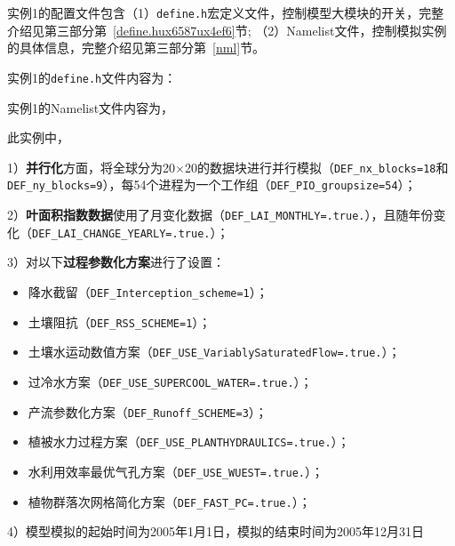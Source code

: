 实例1的配置文件包含（1）\texttt{define.h}宏定义文件，控制模型大模块的开关，完整介绍见第三部分第~\ref{define.hux6587ux4ef6}节; （2）Namelist文件，控制模拟实例的具体信息，完整介绍见第三部分第~\ref{nml}节。

实例1的\texttt{define.h}文件内容为：


实例1的Namelist文件内容为，


此实例中，\par
1）\textbf{并行化}方面，将全球分为20\textdegree$\times$20\textdegree 的数据块进行并行模拟（\texttt{DEF\_nx\_blocks=18}和\texttt{DEF\_ny\_blocks=9}），每54个进程为一个工作组（\texttt{DEF\_PIO\_groupsize=54}）；\par
2）\textbf{叶面积指数数据}使用了月变化数据（\texttt{DEF\_LAI\_MONTHLY=.true.}），且随年份变化（\texttt{DEF\_LAI\_CHANGE\_YEARLY=.true.}）；\par

3）对以下\textbf{过程参数化方案}进行了设置：
\begin{itemize}[nosep,leftmargin=4em]
    \item 降水截留（\texttt{DEF\_Interception\_scheme=1}）；
    \item 土壤阻抗（\texttt{DEF\_RSS\_SCHEME=1}）；
    \item 土壤水运动数值方案（\texttt{DEF\_USE\_VariablySaturatedFlow=.true.}）；
    \item 过冷水方案（\texttt{DEF\_USE\_SUPERCOOL\_WATER=.true.}）；
    \item 产流参数化方案（\texttt{DEF\_Runoff\_SCHEME=3}）；
    \item 植被水力过程方案（\texttt{DEF\_USE\_PLANTHYDRAULICS=.true.}）；
    \item 水利用效率最优气孔方案（\texttt{DEF\_USE\_WUEST=.true.}）；
    \item 植物群落次网格简化方案（\texttt{DEF\_FAST\_PC=.true.}）；

\end{itemize}
\par
4）模型模拟的起始时间为2005年1月1日，模拟的结束时间为2005年12月31日\par

